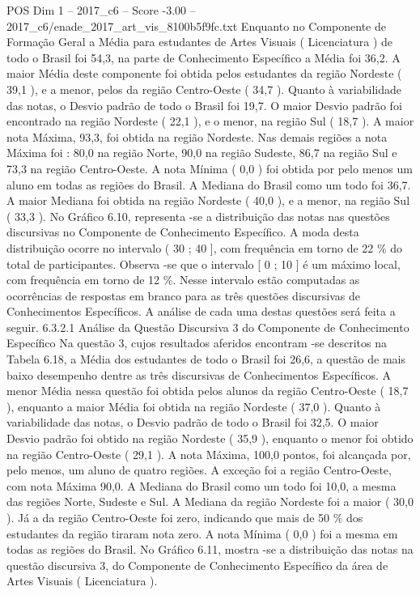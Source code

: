 \begin{textsample}{POS Dim 1 – 2017\_c6 – Score -3.00 – 2017\_c6/enade\_2017\_art\_vis\_8100b5f9fc.txt}
Enquanto no Componente de Formação Geral a Média para estudantes de Artes Visuais ( Licenciatura ) de todo o Brasil foi 54,3, na parte de Conhecimento Específico a Média foi 36,2.
A maior Média deste componente foi obtida pelos estudantes da região Nordeste ( 39,1 ), e a menor, pelos da região Centro-Oeste ( 34,7 ).
Quanto à variabilidade das notas, o Desvio padrão de todo o Brasil foi 19,7.
O maior Desvio padrão foi encontrado na região Nordeste ( 22,1 ), e o menor, na região Sul ( 18,7 ).
A maior nota Máxima, 93,3, foi obtida na região Nordeste.
Nas demais regiões a nota Máxima foi : 80,0 na região Norte, 90,0 na região Sudeste, 86,7 na região Sul e 73,3 na região Centro-Oeste.
A nota Mínima ( 0,0 ) foi obtida por pelo menos um aluno em todas as regiões do Brasil.
A Mediana do Brasil como um todo foi 36,7.
A maior Mediana foi obtida na região Nordeste ( 40,0 ), e a menor, na região Sul ( 33,3 ).
No Gráfico 6.10, representa -se a distribuição das notas nas questões discursivas no Componente de Conhecimento Específico.
A moda desta distribuição ocorre no intervalo ( 30 ; 40 ], com frequência em torno de 22 \% do total de participantes.
Observa -se que o intervalo [ 0 ; 10 ] é um máximo local, com frequência em torno de 12 \%.
Nesse intervalo estão computadas as ocorrências de respostas em branco para as três questões discursivas de Conhecimentos Específicos.
A análise de cada uma destas questões será feita a seguir. 6.3.2.1 Análise da Questão Discursiva 3 do Componente de Conhecimento Específico Na questão 3, cujos resultados aferidos encontram -se descritos na Tabela 6.18, a Média dos estudantes de todo o Brasil foi 26,6, a questão de mais baixo desempenho dentre as três discursivas de Conhecimentos Específicos.
A menor Média nessa questão foi obtida pelos alunos da região Centro-Oeste ( 18,7 ), enquanto a maior Média foi obtida na região Nordeste ( 37,0 ).
Quanto à variabilidade das notas, o Desvio padrão de todo o Brasil foi 32,5.
O maior Desvio padrão foi obtido na região Nordeste ( 35,9 ), enquanto o menor foi obtido na região Centro-Oeste ( 29,1 ).
A nota Máxima, 100,0 pontos, foi alcançada por, pelo menos, um aluno de quatro regiões.
A exceção foi a região Centro-Oeste, com nota Máxima 90,0.
A Mediana do Brasil como um todo foi 10,0, a mesma das regiões Norte, Sudeste e Sul.
A Mediana da região Nordeste foi a maior ( 30,0 ).
Já a da região Centro-Oeste foi zero, indicando que mais de 50 \% dos estudantes da região tiraram nota zero.
A nota Mínima ( 0,0 ) foi a mesma em todas as regiões do Brasil.
No Gráfico 6.11, mostra -se a distribuição das notas na questão discursiva 3, do Componente de Conhecimento Específico da área de Artes Visuais ( Licenciatura ).

\end{textsample}
